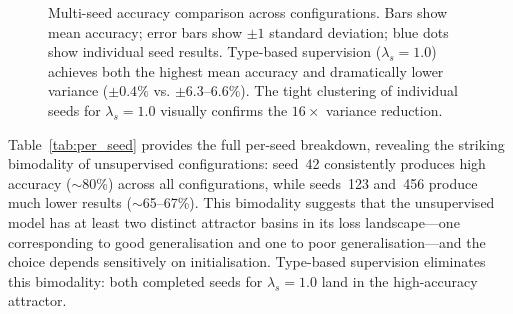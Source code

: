\documentclass[conference]{IEEEtran}
\begin{document}
\begin{figure}[t]
    \centering
    \caption{Multi-seed accuracy comparison across configurations.
    Bars show mean accuracy; error bars show $\pm 1$ standard
    deviation; blue dots show individual seed results.
    Type-based supervision ($\lambda_s{=}1.0$) achieves both
    the highest mean accuracy and dramatically lower variance
    ($\pm 0.4\%$ vs. $\pm 6.3$--$6.6\%$).  The tight clustering
    of individual seeds for $\lambda_s{=}1.0$ visually confirms
    the $16\times$ variance reduction.}
    \label{fig:multiseed_variance}
\end{figure}

Table~\ref{tab:per_seed} provides the full per-seed breakdown,
revealing the striking bimodality of unsupervised configurations:
seed~42 consistently produces high accuracy ($\sim$80\%) across
all configurations, while seeds~123 and~456 produce much lower
results ($\sim$65--67\%).  This bimodality suggests that the
unsupervised model has at least two distinct attractor basins
in its loss landscape---one corresponding to good generalisation
and one to poor generalisation---and the choice depends sensitively
on initialisation.  Type-based supervision eliminates this
bimodality: both completed seeds for $\lambda_s{=}1.0$ land in
the high-accuracy attractor.
\end{document}
